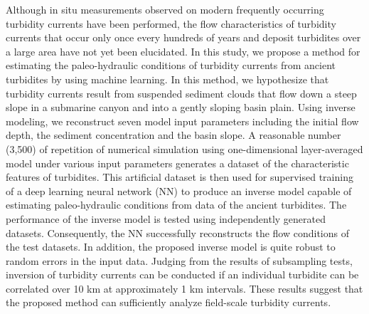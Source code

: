 
  Although in situ measurements observed on modern frequently occurring turbidity currents have been performed, the flow characteristics of turbidity currents that occur only once every hundreds of years and deposit turbidites over a large area have not yet been elucidated. In this study, we propose a method for estimating the paleo-hydraulic conditions of turbidity currents from ancient turbidites by using machine learning. In this method, we hypothesize that turbidity currents result from suspended sediment clouds that flow down a steep slope in a submarine canyon and into a gently sloping basin plain. Using inverse modeling, we reconstruct seven model input parameters including the initial flow depth, the sediment concentration and the basin slope. A reasonable number (3,500) of repetition of numerical simulation using one-dimensional layer-averaged model under various input parameters generates a dataset of the characteristic features of turbidites. This artificial dataset is then used for supervised training of a deep learning neural network (NN) to produce an inverse model capable of estimating paleo-hydraulic conditions from data of the ancient turbidites. The performance of the inverse model is tested using independently generated datasets. Consequently, the NN successfully reconstructs the flow conditions of the test datasets. In addition, the proposed inverse model is quite robust to random errors in the input data. Judging from the results of subsampling tests, inversion of turbidity currents can be conducted if an individual turbidite can be correlated over 10 km at approximately 1 km intervals. These results suggest that the proposed method can sufficiently analyze field-scale turbidity currents.